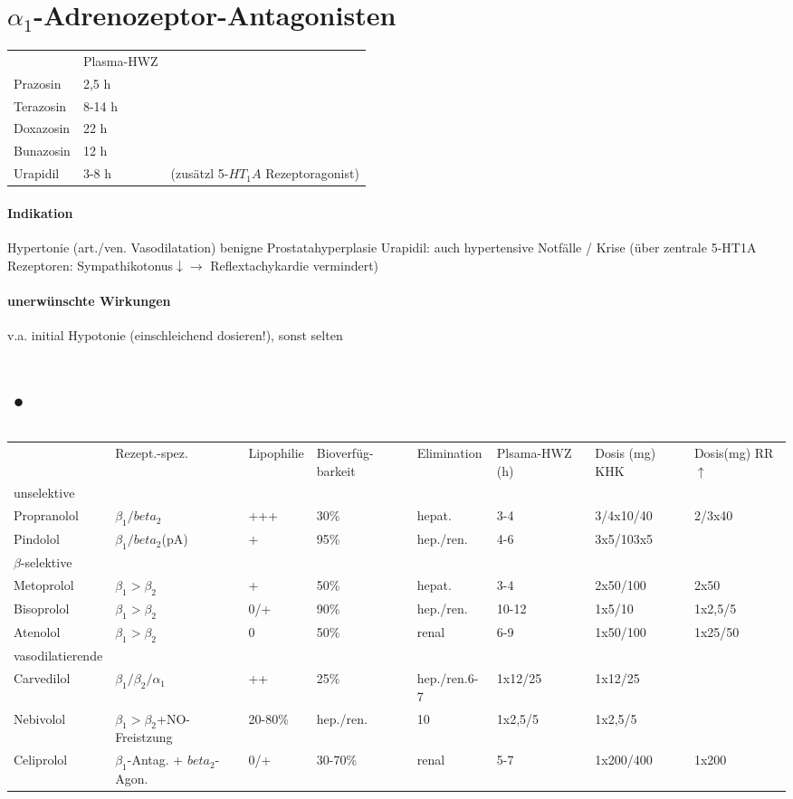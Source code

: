 \documentclass[10pt,a4paper]{report}
\begin{document}
\section{$\alpha_1$-Adrenozeptor-Antagonisten}
\begin{tabularx}{\textwidth}{XXX}
&Plasma-HWZ&\\	   
Prazosin&2,5 h&\\		   
Terazosin&8-14 h&\\		   
Doxazosin&22 h&\\ 
Bunazosin&12 h&\\  
Urapidil&3-8 h&	(zusätzl 5-$HT_1A$ Rezeptoragonist)\\	  
\end{tabularx}
\paragraph{Indikation}
Hypertonie (art./ven. Vasodilatation)
benigne Prostatahyperplasie
Urapidil: auch hypertensive Notfälle / Krise (über zentrale 5-HT1A Rezeptoren: Sympathikotonus$\downarrow \rightarrow$ Reflextachykardie vermindert)
\paragraph{unerwünschte Wirkungen} v.a. initial Hypotonie (einschleichend dosieren!), sonst selten
\section{•}
\begin{table}[htbp]
\caption{}
\begin{tabularx}{\textwidth}{XXXXXXXX}
&Rezept.-spez.&Lipophilie&Bioverfüg-barkeit&Elimination&Plsama-HWZ (h)&Dosis (mg) KHK&Dosis(mg) RR$\uparrow$\\
unselektive&&&&&&\\
Propranolol&$\beta_1/beta_2$&+++& 30\%&hepat.&3-4&3/4x10/40&2/3x40\\
Pindolol&$\beta_1/beta_2$(pA)&+&95\%&hep./ren.&4-6&3x5/103x5\\
$\beta$-selektive&&&&&&&\\
Metoprolol&$\beta_1>\beta_2$&+&50\%&hepat.&3-4&2x50/100&2x50\\
Bisoprolol&$\beta_1>\beta_2$&0/+&90\%&hep./ren.&10-12&1x5/10&1x2,5/5\\
Atenolol&$\beta_1>\beta_2$&0&50\%&renal&6-9&1x50/100&1x25/50\\
vasodilatierende&&&&&&&\\
Carvedilol&$\beta_1/\beta_2/\alpha_1$&++&25\%&hep./ren.6-7&1x12/25&1x12/25\\
Nebivolol&$\beta_1>\beta_2$+NO-Freistzung&20-80\%&hep./ren.&10&1x2,5/5&1x2,5/5\\
Celiprolol&$\beta_1$-Antag. + $beta_2$-Agon.&0/+&30-70\%&renal&5-7&1x200/400&1x200\\
\end{tabularx}
\label{}
\end{table}
\end{document}
